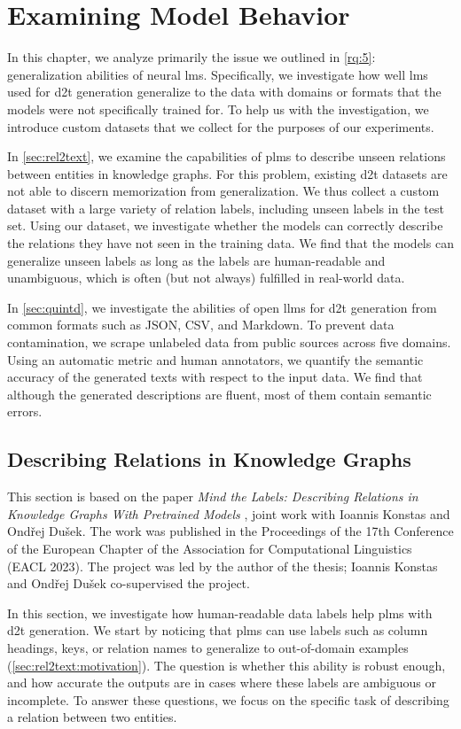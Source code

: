 
\chapter{Examining Model Behavior}
\label{chap:investigating}

In this chapter, we analyze primarily the issue we outlined in \ref{rq:5}: generalization abilities of neural \acp{lm}. Specifically, we investigate how well \acp{lm} used for \ac{d2t} generation generalize to the data with domains or formats that the models were not specifically trained for. To help us with the investigation, we introduce custom datasets that we collect for the purposes of our experiments.

In \autoref{sec:rel2text}, we examine the capabilities of \acp{plm} to describe unseen relations between entities in knowledge graphs. For this problem, existing \ac{d2t} datasets are not able to discern memorization from generalization. We thus collect a custom dataset with a large variety of relation labels, including unseen labels in the test set. Using our dataset, we investigate whether the models can correctly describe the relations they have not seen in the training data. We find that the models can generalize unseen labels as long as the labels are human-readable and unambiguous, which is often (but not always) fulfilled in real-world data.

In \autoref{sec:quintd}, we investigate the abilities of open \acp{llm} for \ac{d2t} generation from common formats such as JSON, CSV, and Markdown. To prevent data contamination, we scrape unlabeled data from public sources across five domains. Using an automatic metric and human annotators, we quantify the semantic accuracy of the generated texts with respect to the input data. We find that although the generated descriptions are fluent, most of them contain semantic errors.

\section{Describing Relations in Knowledge Graphs}
\label{sec:rel2text}
\begin{refbox}
    This section is based on the paper \emph{Mind the Labels: Describing Relations in Knowledge Graphs With Pretrained Models} \cite{kasnerMindLabelsDescribing2022}, joint work with Ioannis Konstas and Ondřej Dušek. The work was published in the Proceedings of the 17th Conference of the European Chapter of the Association for Computational Linguistics (EACL 2023). The project was led by the author of the thesis; Ioannis Konstas and Ondřej Dušek co-supervised the project.
\end{refbox}
In this section, we investigate how human-readable data labels help \acp{plm} with \ac{d2t} generation. We start by noticing that \acp{plm} can use labels such as column headings, keys, or relation names to generalize to out-of-domain examples (\autoref{sec:rel2text:motivation}). The question is whether this ability is robust enough, and how accurate the outputs are in cases where these labels are ambiguous or incomplete. To answer these questions, we focus on the specific task of describing a relation between two entities.

